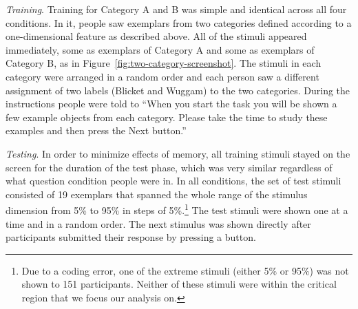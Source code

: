 \documentclass[doc,apacite]{apa6}
\begin{document}

{\it Training}. Training for Category A and B was simple and identical across all four conditions. In it, people saw exemplars from two categories defined according to a one-dimensional feature as described above. All of the stimuli appeared immediately, some as exemplars of Category A and some as exemplars of Category B, as in Figure~\ref{fig:two-category-screenshot}. The stimuli in each category were arranged in a random order and each person saw a different assignment of two labels (Blicket and Wuggam) to the two categories. During the instructions people were told to ``When you start the task you will be shown a few example objects from each category. Please take the time to study these examples and then press the Next button.''

{\it Testing}.  In order to minimize effects of memory, all training stimuli stayed on the screen for the duration of the test phase, which was very similar regardless of what question condition people were in. In all conditions, the set of test stimuli consisted of 19 exemplars that spanned the whole range of the stimulus dimension from 5\% to 95\% in steps of 5\%.\footnote{Due to a coding error, one of the extreme stimuli (either 5\% or 95\%) was not shown to 151 participants. Neither of these stimuli were within the critical region that we focus our analysis on.} The test stimuli were shown one at a time and in a random order. The next stimulus was shown directly after participants submitted their response by pressing a button.
\end{document}
